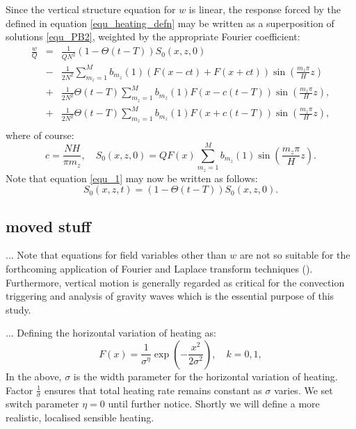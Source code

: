 \documentclass[a4paper,10pt]{article}
\newcommand{\heavi}{\Theta}
\begin{document}
Since the vertical structure equation for $w$ is linear, the response forced by the defined in equation \ref{equ_heating_defn}
may be written as a superposition of solutions \ref{equ_PB2}, weighted by the appropriate Fourier coefficient:
%
\begin{eqnarray}
\label{equ_2}
\frac{w }{Q} & = & \frac{1}{Q N^2} (1 - \heavi(t-T)) S_0(x,z,0) \\ \nonumber
& - & \frac{1}{2 N^2}  \sum_{m_z = 1}^{M} b_{m_z} (1)\left(F(x-ct)  + F(x+ct)   \right) \sin \left( \frac{m_z \pi} {H} z\right) \\ \nonumber
& + & \frac{1}{2 N^2} \heavi(t-T) \sum_{m_z = 1}^{M} b_{m_z} (1) F(x-c(t-T))  \sin \left( \frac{m_z \pi} {H} z\right), \\ \nonumber
& + & \frac{1}{2 N^2} \heavi(t-T) \sum_{m_z = 1}^{M} b_{m_z} (1) F(x+c(t-T))  \sin \left( \frac{m_z \pi} {H} z\right), \\ \nonumber
\end{eqnarray}
%
where of course:
%
\begin{equation}
c = \frac{NH}{\pi m_z}, \quad S_0 (x,z,0) = Q F(x) \sum_{m_z=1}^{M} b_{m_z} (1) \sin \left( \frac{m_z \pi} {H} z\right).
\end{equation}
%
Note that equation \ref{equ_1} may now be written as follows:
%
\begin{equation}
S_{0}(x,z,t) = (1 - \heavi(t-T) ) S_0(x,z,0).
 \end{equation}
%
%
%




%
%
%
\subsection{moved stuff}
...
Note that equations for field variables other than $w$ are not so suitable for the 
forthcoming application of Fourier and Laplace transform techniques (\citep{arfken2013mathematical}). Furthermore,
vertical motion is generally regarded as critical for the convection triggering and analysis of gravity waves 
which is the essential purpose of this study. 

...
Defining the horizontal variation of heating as:
%
\begin{equation}
\label{equ_horizontal_heating}
F(x) = \frac{1}{\sigma^\eta}\exp \left( -\frac{x^2}{2 \sigma^2} \right), \quad k =0,1,
\end{equation}
%
In the above, $\sigma$ is the width parameter for the horizontal variation of heating. Factor $\frac{1}{\sigma}$ 
ensures that total heating rate remains constant as $\sigma$ varies. We set switch parameter $\eta=0$ until further notice. 
Shortly we will define a more realistic, localised sensible heating. 
\end{document}

